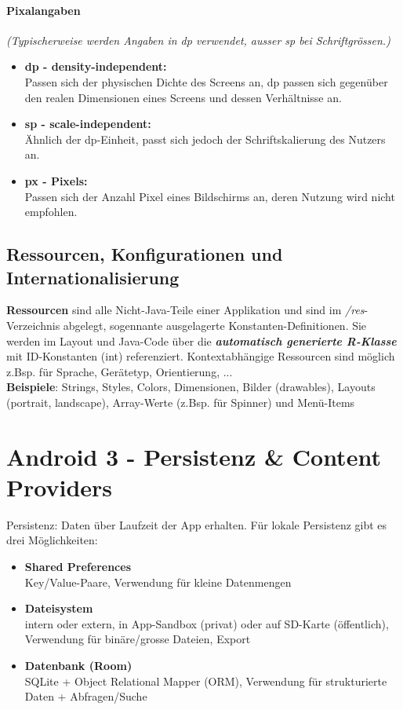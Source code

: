 \documentclass[a4paper]{article}
\begin{document}
\paragraph{Pixalangaben}
\textit{(Typischerweise werden Angaben in dp verwendet, ausser sp bei Schriftgrössen.)}
\begin{itemize}
	\item \textbf{dp - density-independent:} \\ Passen sich der physischen Dichte des Screens an, dp passen sich gegenüber den realen Dimensionen eines Screens und dessen Verhältnisse an.
	\item \textbf{sp - scale-independent:} \\Ähnlich der dp-Einheit, passt sich jedoch der Schriftskalierung des Nutzers an.
	\item \textbf{px - Pixels:} \\Passen sich der Anzahl Pixel eines Bildschirms an, deren Nutzung wird nicht empfohlen.
\end{itemize}

\newpage

\subsection{Ressourcen, Konfigurationen und Internationalisierung}
\textbf{Ressourcen} sind alle Nicht-Java-Teile einer Applikation und sind im \textit{/res}-Verzeichnis abgelegt, sogennante ausgelagerte Konstanten-Definitionen. Sie werden im Layout und Java-Code über die \textbf{\textit{automatisch generierte R-Klasse}} mit ID-Konstanten (int) referenziert. Kontextabhängige Ressourcen sind möglich z.Bsp. für Sprache, Gerätetyp, Orientierung, ...\\
\textbf{Beispiele}: Strings, Styles, Colors, Dimensionen, Bilder (drawables), Layouts (portrait, landscape), Array-Werte (z.Bsp. für Spinner) und Menü-Items\\


\newpage
\section{Android 3 - Persistenz \& Content Providers}

Persistenz: Daten über Laufzeit der App erhalten.
Für lokale Persistenz gibt es drei Möglichkeiten:
\begin{itemize}
	\item \textbf{Shared Preferences}\\
	Key/Value-Paare, Verwendung für kleine Datenmengen
	\item \textbf{Dateisystem}\\
	intern oder extern, in App-Sandbox (privat) oder auf SD-Karte (öffentlich), Verwendung für binäre/grosse Dateien, Export
	\item \textbf{Datenbank (Room)}\\
	SQLite + Object Relational Mapper (ORM), Verwendung für strukturierte Daten + Abfragen/Suche
\end{itemize}
\end{document}
